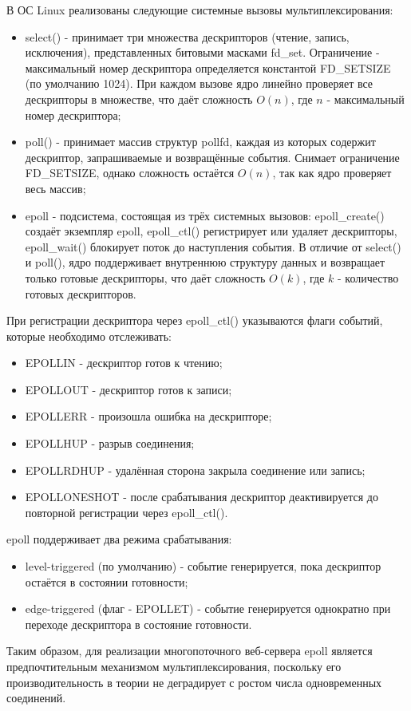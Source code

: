 В ОС Linux реализованы следующие системные вызовы мультиплексирования:
\begin{itemize}
	\item select() - принимает три множества дескрипторов
	(чтение, запись, исключения), представленных битовыми масками fd\_set.
	Ограничение - максимальный номер дескриптора определяется константой
	FD\_SETSIZE (по умолчанию 1024).
	При каждом вызове ядро линейно проверяет все дескрипторы в множестве,
	что даёт сложность $O(n)$, где $n$ - максимальный номер дескриптора; \cite{mike_book}
	\item poll() - принимает массив структур pollfd,
	каждая из которых содержит дескриптор, запрашиваемые и возвращённые события.
	Снимает ограничение FD\_SETSIZE,
	однако сложность остаётся $O(n)$, так как ядро проверяет весь массив;
	\item epoll - подсистема, состоящая из трёх системных вызовов:
	epoll\_create() создаёт экземпляр epoll,
	epoll\_ctl() регистрирует или удаляет дескрипторы,
	epoll\_wait() блокирует поток до наступления события.
	В отличие от select() и poll(),
	ядро поддерживает внутреннюю структуру данных
	и возвращает только готовые дескрипторы,
	что даёт сложность $O(k)$, где $k$ - количество готовых дескрипторов. \cite{mike_book}
\end{itemize}

При регистрации дескриптора через epoll\_ctl()
указываются флаги событий, которые необходимо отслеживать:
\begin{itemize}
	\item EPOLLIN - дескриптор готов к чтению;
	\item EPOLLOUT - дескриптор готов к записи;
	\item EPOLLERR - произошла ошибка на дескрипторе;
	\item EPOLLHUP - разрыв соединения;
	\item EPOLLRDHUP - удалённая сторона закрыла соединение или запись;
	\item EPOLLONESHOT - после срабатывания дескриптор деактивируется
	до повторной регистрации через epoll\_ctl().
\end{itemize}

epoll поддерживает два режима срабатывания:
\begin{itemize}
	\item level-triggered (по умолчанию) - событие генерируется,
	пока дескриптор остаётся в состоянии готовности;
	\item edge-triggered (флаг - EPOLLET) - событие генерируется
	однократно при переходе дескриптора в состояние готовности.
\end{itemize}

Таким образом, для реализации многопоточного веб-сервера
epoll является предпочтительным механизмом мультиплексирования,
поскольку его производительность в теории не деградирует
с ростом числа одновременных соединений.